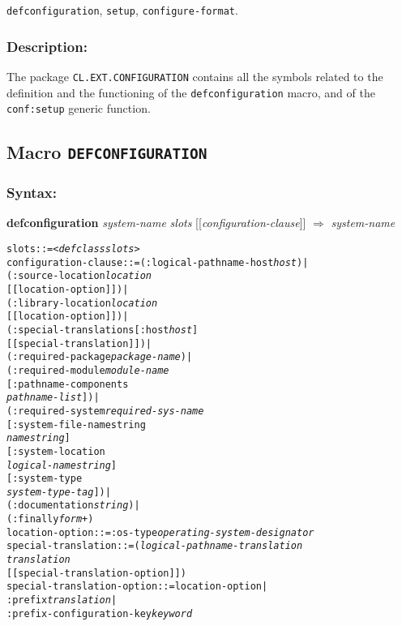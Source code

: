 \documentclass{article}
\newcommand{\DEFCONFIGURATION}{\texttt{DEFCONFIGURATION}}
\newcommand{\defconfiguration}{\texttt{defconfiguration}}
\newcommand{\code}[1]{\texttt{#1}}
\begin{document}
\code{defconfiguration}, \code{setup}, \code{configure-format}.

\subsubsection*{Description:}

The package \code{CL.EXT.CONFIGURATION} contains all the symbols
related to the definition and the functioning of the
\defconfiguration{} macro, and of the \code{conf:setup} generic
function.

\subsection*{Macro \DEFCONFIGURATION{}}

\subsubsection*{Syntax:}

\textbf{defconfiguration} \emph{system-name} \emph{slots}
[[\emph{configuration-clause}]] $\Rightarrow$ \emph{system-name}

\begin{alltt}
slots ::= \emph{<defclass slots>}
configuration-clause ::= (:logical-pathname-host \emph{host}) |
                         (:source-location \emph{location}
                                           [[location-option]]) |
                         (:library-location \emph{location}
                                            [[location-option]]) |
                         (:special-translations [:host \emph{host}]
                                                [[special-translation]]) |
                         (:required-package \emph{package-name}) |
                         (:required-module \emph{module-name}
                                           [:pathname-components
                                            \emph{pathname-list}]) |
                         (:required-system \emph{required-sys-name}
                                           [:system-file-namestring
                                            \emph{namestring}]
                                           [:system-location
                                            \emph{logical-namestring}]
                                           [:system-type
                                            \emph{system-type-tag}]) |
                         (:documentation \emph{string}) |
                         (:finally \emph{form}+)
location-option ::= :os-type \emph{operating-system-designator}
special-translation ::= (\emph{logical-pathname-translation}
                         \emph{translation}
                         [[special-translation-option]])
special-translation-option ::= location-option |
                               :prefix \emph{translation} |
                               :prefix-configuration-key \emph{keyword}
\end{alltt}
\end{document}
